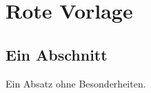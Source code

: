 \chapter{Rote Vorlage}\label{c98}

\section{Ein Abschnitt}\label{c98.s1}

Ein Absatz ohne Besonderheiten.
